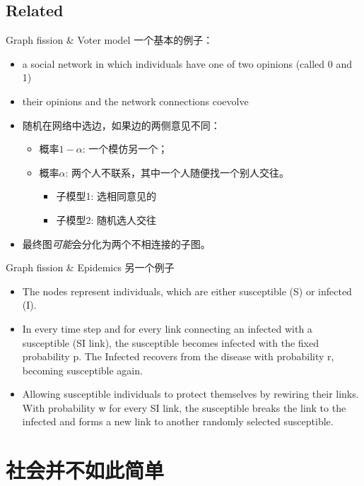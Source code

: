 \documentclass{beamer}
\begin{document}
\subsection{Related}
\begin{frame}{Graph fission \& Voter model}
一个基本的例子：
\begin{itemize}
    \item a social network in which individuals have one of two opinions (called 0 and 1) 
    \item their opinions and the network connections coevolve
    \item 随机在网络中选边，如果边的两侧意见不同：
    \begin{itemize}
        \item 概率$1-\alpha$: 一个模仿另一个；
        \item 概率$\alpha$: 两个人不联系，其中一个人随便找一个别人交往。
        \begin{itemize}
            \item 子模型1: 选相同意见的
            \item 子模型2: 随机选人交往
        \end{itemize}
    \end{itemize}
    \item 最终图\textit{可能}会分化为两个不相连接的子图。
    \end{itemize}    
\end{frame}
\begin{frame}{Graph fission \& Epidemics}
另一个例子
\begin{itemize}
    \item The nodes represent individuals, which are either susceptible (S) or infected (I). 
    \item In every time step and for every link connecting an infected with a susceptible (SI link), the susceptible becomes infected with the fixed probability p. The Infected recovers from the disease with probability r, becoming susceptible again.
    \item Allowing susceptible individuals to protect themselves by rewiring their links. With probability w for every SI link, the susceptible breaks the link to the infected and forms a new link to another randomly selected susceptible. 
\end{itemize}
    
\end{frame}
\section{社会并不如此简单}
\end{document}
